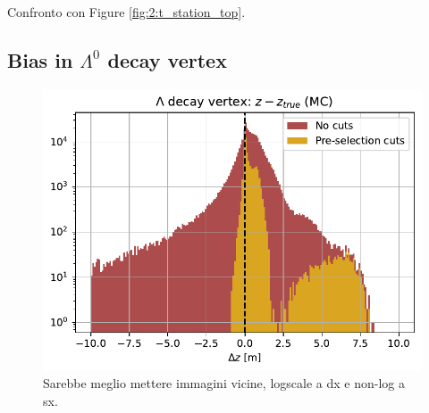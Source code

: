 Confronto con Figure \ref{fig:2:t_station_top}.

\subsection{Bias in $\Lambda^0$ decay vertex}
\label{sec:lambda_endvertex_bias}
\begin{figure}[t]
	\centering
	\includegraphics[width=.6\textwidth]{graphics/04-event_selection/LEVz_MC_true-residuals.pdf}
	\caption{Sarebbe meglio mettere immagini vicine, logscale a dx e non-log a sx.}
\end{figure}

